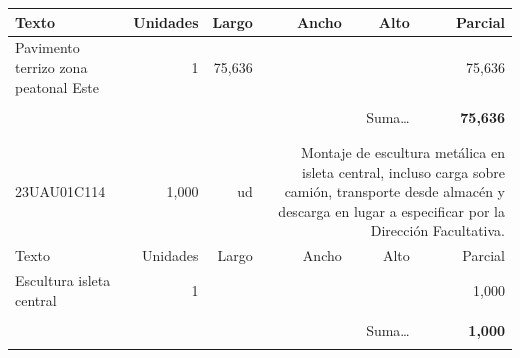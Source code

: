 \documentclass{book}%
\begin{document}
\begin{longtable}{lrrrrr}
Texto&Unidades&Largo&Ancho&Alto&Parcial\\%
\hline%
\multicolumn{1}{p{3.5cm}}{Pavimento terrizo zona peatonal Este}&1&75,636&&&    75,636\\%
&&&&&\\%
\multicolumn{5}{r}{Suma\ldots}&\textbf{    75,636}\\%
\hline%
&&&&&\\%
&&&&&\\%
23UAU01C114&     1,000& ud&\multicolumn{3}{p{6cm}}{\scriptsize Montaje de escultura metálica en isleta central, incluso carga sobre camión, transporte desde almacén y descarga en lugar a especificar por la Dirección Facultativa.\normalsize}\\%
Texto&Unidades&Largo&Ancho&Alto&Parcial\\%
\hline%
\multicolumn{1}{p{3.5cm}}{Escultura isleta central }&1&&&&     1,000\\%
&&&&&\\%
\multicolumn{5}{r}{Suma\ldots}&\textbf{     1,000}\\%
\hline%
&&&&&\\%
\end{longtable}%
\newpage

%
\end{document}
